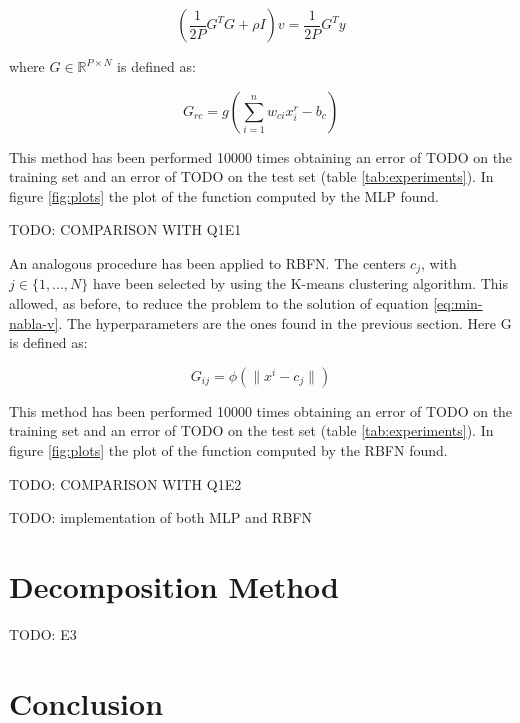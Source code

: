 \documentclass[a4paper]{article}
\numberwithin{equation}{section} %
\numberwithin{figure}{section} %
\numberwithin{table}{section} %
\theoremstyle{definition}
\begin{document}
\[ \left( \frac{1}{2P} G^T G + \rho I \right) v = \frac{1}{2P} G^T y \]

\noindent where $G \in \mathbb{R}^{P \times N}$ is defined as:

\[ G_{rc} = g\left( \sum_{i=1}^{n} w_{ci}x_i^r - b_c \right) \]

This method has been performed 10000 times obtaining an error of TODO on the
training set and an error of TODO on the test set (table \ref{tab:experiments}). In figure
\ref{fig:plots} the plot of the function computed by the MLP found.

TODO: COMPARISON WITH Q1E1

An analogous procedure has been applied to RBFN.
The centers $c_j$, with $ j \in \{ 1,  ..., N \} $ have been selected by
using the K-means clustering algorithm. This allowed, as before, to reduce the
problem to the solution of equation \ref{eq:min-nabla-v}. The hyperparameters
are the ones found in the previous section. Here G is defined as:

\[ G_{ij} = \phi\left( \| x^i - c_j \| \right) \]

This method has been performed 10000 times obtaining an error of TODO on the
training set and an error of TODO on the test set (table \ref{tab:experiments}). In figure
\ref{fig:plots} the plot of the function computed by the RBFN found.

TODO: COMPARISON WITH Q1E2

TODO: implementation of both MLP and RBFN


\section{Decomposition Method}

TODO: E3


\section{Conclusion}
\end{document}
